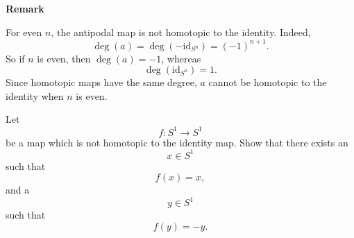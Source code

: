 \begin{solution}
\medskip
\noindent\textbf{Remark}\par
\smallskip


For even \(n\), the antipodal map is not homotopic to the identity. Indeed,
\[
\deg(a)=\deg(-\mathrm{id}_{S^n})=(-1)^{n+1}.
\]
So if \(n\) is even, then \(\deg(a)=-1\), whereas
\[
\deg(\mathrm{id}_{S^n})=1.
\]
Since homotopic maps have the same degree, \(a\) cannot be homotopic to the identity when \(n\) is even.
\end{solution}

\begin{problem}
Let
\[
f:S^1\to S^1
\]
be a map which is not homotopic to the identity map. Show that there exists an
\[
x\in S^1
\]
such that
\[
f(x)=x,
\]
and a
\[
y\in S^1
\]
such that
\[
f(y)=-y.
\]
\end{problem}


